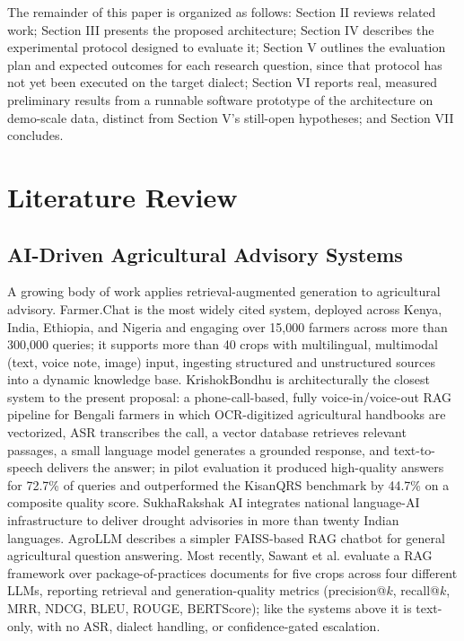 \documentclass[conference]{IEEEtran}
\begin{document}
The remainder of this paper is organized as follows: Section II reviews related work; Section III presents the proposed architecture; Section IV describes the experimental protocol designed to evaluate it; Section V outlines the evaluation plan and expected outcomes for each research question, since that protocol has not yet been executed on the target dialect; Section VI reports real, measured preliminary results from a runnable software prototype of the architecture on demo-scale data, distinct from Section V's still-open hypotheses; and Section VII concludes.

\section{Literature Review}


\subsection{AI-Driven Agricultural Advisory Systems}

A growing body of work applies retrieval-augmented generation to agricultural advisory. Farmer.Chat \cite{farmerchat2024} is the most widely cited system, deployed across Kenya, India, Ethiopia, and Nigeria and engaging over 15,000 farmers across more than 300,000 queries; it supports more than 40 crops with multilingual, multimodal (text, voice note, image) input, ingesting structured and unstructured sources into a dynamic knowledge base. KrishokBondhu \cite{ameen2026krishokbondhu} is architecturally the closest system to the present proposal: a phone-call-based, fully voice-in/voice-out RAG pipeline for Bengali farmers in which OCR-digitized agricultural handbooks are vectorized, ASR transcribes the call, a vector database retrieves relevant passages, a small language model generates a grounded response, and text-to-speech delivers the answer; in pilot evaluation it produced high-quality answers for 72.7\% of queries and outperformed the KisanQRS benchmark \cite{rehman2023kisanqrs} by 44.7\% on a composite quality score. SukhaRakshak AI \cite{iwmi2025sukharakshak} integrates national language-AI infrastructure to deliver drought advisories in more than twenty Indian languages. AgroLLM \cite{agrollm2025} describes a simpler FAISS-based RAG chatbot for general agricultural question answering. Most recently, Sawant et al. \cite{sawant2026farmeraiframework} evaluate a RAG framework over package-of-practices documents for five crops across four different LLMs, reporting retrieval and generation-quality metrics (precision@$k$, recall@$k$, MRR, NDCG, BLEU, ROUGE, BERTScore); like the systems above it is text-only, with no ASR, dialect handling, or confidence-gated escalation.
\end{document}
